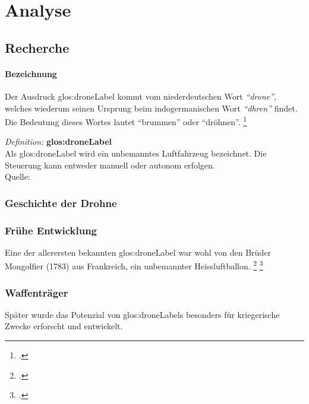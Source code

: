 \chapter{Analyse}

\section{Recherche}
\label{sec:recherche}

\subsubsection{Bezeichnung}
Der Ausdruck \gls{glos:droneLabel} kommt vom niederdeutschen Wort \textit{"`drone"'}, welches wiederum seinen Ursprung beim indogermanischen Wort \textit{"`dhren"'} findet. Die Bedeutung dieses Wortes lautet "`brummen"' oder "`dröhnen"'. \footcite{Geschichte_der_Drohne_-_Nachrichten_Print_-_DIE_WELT_-_Wissen_Print_DW_-_DIE_WELT_2015-03-21}

\begin{framed}
	\textit{Definition: }\textbf{\gls{glos:droneLabel}}\\
	Als \gls{glos:droneLabel} wird ein unbemanntes Luftfahrzeug bezeichnet. Die Steuerung kann entweder manuell oder autonom erfolgen.\\
	Quelle:
\end{framed}

\subsection{Geschichte der Drohne}

\subsection{Frühe Entwicklung}
Eine der allerersten bekannten \gls{glos:droneLabel} war wohl von den Brüder Mongolfier (1783) aus Frankreich, ein unbemannter Heissluftballon. \footcite{Kleine_Geschichte_der_Drohnen_-_Nachrichten_Print_-_WELT_KOMPAKT_-_Lifestyle_-_DIE_WELT_2015-03-21}
\footcite{Unbemannte_Luftfahrt__Wikipedia_2015-03-22}

\subsection{Waffenträger}
Später wurde das Potenzial von \glspl{glos:droneLabel} besonders für kriegerische Zwecke erforscht und entwickelt.

